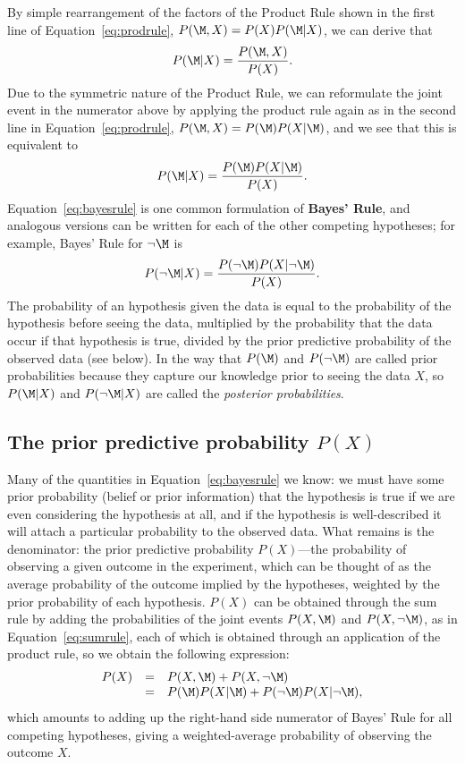 By simple rearrangement of the factors of the Product Rule shown in the first line of Equation~\ref{eq:prodrule}, $P(\M,X)=P(X)P(\M|X)$, we can derive that $$P(\M|X) = \frac{P(\M,X)}{P(X)}.$$  Due to the symmetric nature of the Product Rule, we can reformulate the joint event in the numerator above by applying the product rule again as in the second line in Equation~\ref{eq:prodrule}, $P(\M,X)=P(\M)P(X|\M)$, and we see that this is equivalent to
\begin{equation}
P(\M|X) = \frac{P(\M)P(X|\M)}{P(X)}.
\label{eq:bayesrule}
\end{equation}
Equation~\ref{eq:bayesrule} is one common formulation of \textbf{Bayes' Rule}, and analogous versions can be written for each of the other competing hypotheses; for example, Bayes' Rule for $\neg\M$ is
$$
P(\neg\M|X) = \frac{P(\neg\M)P(X|\neg\M)}{P(X)}.
$$
The probability of an hypothesis given the data is equal to the probability of the hypothesis before seeing the data, multiplied by the probability that the data occur if that hypothesis is true, divided by the prior predictive probability of the observed data (see below). In the way that $P(\M)$ and $P(\neg\M)$ are called prior probabilities because they capture our knowledge prior to seeing the data $X$, so $P(\M|X)$ and $P(\neg\M|X)$ are called the \emph{posterior probabilities}. 

\subsection{The prior predictive probability $P(X)$}
%
Many of the quantities in Equation~\ref{eq:bayesrule} we know: we must have some prior probability (belief or prior information) that the hypothesis is true if we are even considering the hypothesis at all, and if the hypothesis is well-described it will attach a particular probability to the observed data. What remains is the denominator: the prior predictive probability $P(X)$---the probability of observing a given outcome in the experiment, which can be thought of as the average probability of the outcome implied by the hypotheses, weighted by the prior probability of each hypothesis. $P(X)$ can be obtained through the sum rule by adding the probabilities of the joint events $P(X,\M)$ and $P(X,\neg{\M})$, as in Equation~\ref{eq:sumrule}, each of which is obtained through an application of the product rule, so we obtain the following expression:
\begin{equation}\label{eq:marginal}\begin{array}{rcl}
P(X) &=& P(X,\M) + P(X,\neg{\M})\\ 
&=& P(\M)P(X|\M) + P(\neg{\M})P(X|\neg{\M}),
\end{array}\end{equation}
which amounts to adding up the right-hand side numerator of Bayes' Rule for all competing hypotheses, giving a weighted-average probability of observing the outcome $X$. 

